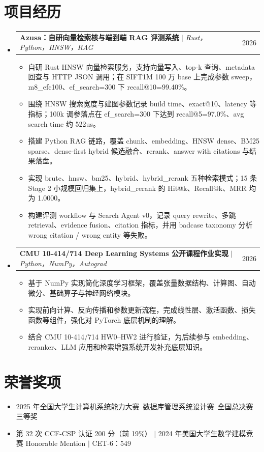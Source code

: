 \documentclass[letterpaper,11pt]{article}
\makeatletter
\newcommand{\resumeItem}[1]{
  \item\small{
    {#1 \vspace{-2pt}}
  }
}
\newcommand{\resumeProjectHeading}[2]{
    \item
    \begin{tabular*}{0.97\textwidth}{l@{\extracolsep{\fill}}r}
      \small#1 & #2 \\
    \end{tabular*}\vspace{-7pt}
}
\newcommand{\resumeSubHeadingListStart}{\begin{itemize}[leftmargin=0.15in, label={}]}
\newcommand{\resumeSubHeadingListEnd}{\end{itemize}}
\newcommand{\resumeItemListStart}{\begin{itemize}}
\newcommand{\resumeItemListEnd}{\end{itemize}\vspace{-5pt}}
\makeatother
\begin{document}
\section{项目经历}
  \resumeSubHeadingListStart
    \resumeProjectHeading
        {\textbf{Azusa：自研向量检索核与端到端 RAG 评测系统} $|$ \emph{Rust，Python，HNSW，RAG}}{2026}
        \resumeItemListStart
          \resumeItem{自研 Rust HNSW 向量检索服务，支持向量写入、top-k 查询、metadata 回查与 HTTP JSON 调用；在 SIFT1M 100 万 base 上完成参数 sweep，m8\_efc100、ef\_search=300 下 recall@10=99.40\%。}
          \resumeItem{围绕 HNSW 搜索宽度与建图参数记录 build time、exact@10、latency 等指标；100k 调参落点在 ef\_search=300 下达到 recall@5=97.0\%、avg search time 约 522us。}
          \resumeItem{搭建 Python RAG 链路，覆盖 chunk、embedding、HNSW dense、BM25 sparse、dense-first hybrid 候选融合、rerank、answer with citations 与结果落盘。}
          \resumeItem{实现 brute、hnsw、bm25、hybrid、hybrid\_rerank 五种检索模式；15 条 Stage 2 小规模回归集上，hybrid\_rerank 的 Hit@k、Recall@k、MRR 均为 1.0000。}
          \resumeItem{构建评测 workflow 与 Search Agent v0，记录 query rewrite、多跳 retrieval、evidence fusion、citation 指标，并用 badcase taxonomy 分析 wrong citation / wrong entity 等失败。}
        \resumeItemListEnd

    \resumeProjectHeading
        {\textbf{CMU 10-414/714 Deep Learning Systems 公开课程作业实现} $|$ \emph{Python，NumPy，Autograd}}{2026}
        \resumeItemListStart
          \resumeItem{基于 NumPy 实现简化深度学习框架，覆盖张量数据结构、计算图、自动微分、基础算子与神经网络模块。}
          \resumeItem{实现前向计算、反向传播和参数更新流程，完成线性层、激活函数、损失函数等组件，强化对 PyTorch 底层机制的理解。}
          \resumeItem{结合 CMU 10-414/714 HW0--HW2 进行验证，为后续参与 embedding、reranker、LLM 应用和检索增强系统开发补充底层知识。}
        \resumeItemListEnd
  \resumeSubHeadingListEnd

\section{荣誉奖项}
  \resumeSubHeadingListStart
    \resumeItem{2025 年全国大学生计算机系统能力大赛~数据库管理系统设计赛~全国总决赛三等奖}
    \resumeItem{第 32 次 CCF-CSP 认证 200 分（前 19\%） $|$ 2024 年美国大学生数学建模竞赛 Honorable Mention $|$ CET-6：549}
  \resumeSubHeadingListEnd

\end{document}

